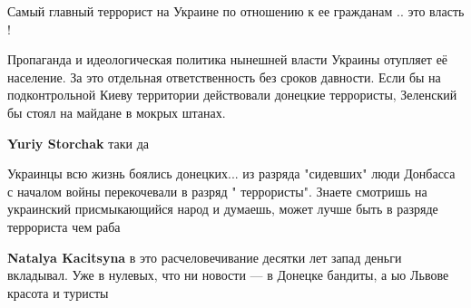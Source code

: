 \begin{itemize}
\begin{itemize}
\end{itemize}

 
Самый главный террорист на Украине по отношению к ее гражданам .. это власть !

 

Пропаганда и идеологическая политика нынешней власти Украины отупляет её
население. За это отдельная ответственность без сроков давности. Если бы на
подконтрольной Киеву территории действовали донецкие террористы, Зеленский бы
стоял на майдане в мокрых штанах.

\begin{itemize}
 
\textbf{Yuriy Storchak} таки да
\end{itemize}

 

Украинцы всю жизнь боялись донецких... из разряда "сидевших" люди Донбасса с
началом войны перекочевали в разряд " террористы". Знаете смотришь на
украинский присмыкающийся народ и думаешь, может лучше быть в разряде террориста
чем раба

\begin{itemize}
 
\textbf{Natalya Kacitsyna} в это расчеловечивание десятки лет запад деньги вкладывал. Уже в нулевых, что ни новости — в Донецке бандиты, а ыо Львове красота и туристы


\end{itemize}
\end{itemize}
